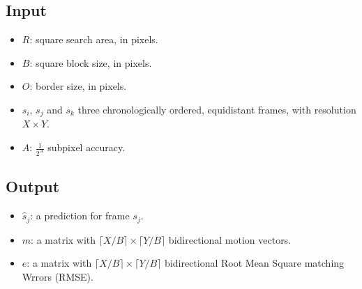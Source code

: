 \subsection*{Input}
\begin{itemize}
\tightlist
\item
  $R$: square search area, in pixels.
\item
  $B$: square block size, in pixels.
\item
  $O$: border size, in pixels.
\item
  $s_i$, $s_j$ and $s_k$ three chronologically ordered,
  equidistant frames, with resolution $X\times Y$.
\item
  $A$: $\frac{1}{2^A}$ subpixel accuracy.
\end{itemize}

\subsection*{Output}
\begin{itemize}
\tightlist
\item
  $\hat{s}_j$: a prediction for frame $s_j$.
\item
  $m$: a matrix with $\lceil X/B\rceil \times \lceil Y/B\rceil$
  bidirectional motion vectors.
\item
  $e$: a matrix with $\lceil X/B\rceil \times \lceil Y/B\rceil$
  bidirectional Root Mean Square matching Wrrors (RMSE).
\end{itemize}

